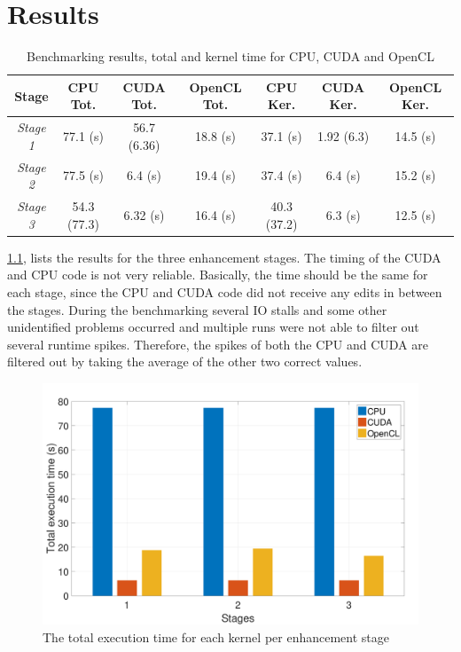 \documentclass[final]{report}
\begin{document}
\chapter{Results}

\begin{table}[H]
	\centering
	\caption{Benchmarking results, total and kernel time for CPU, CUDA and OpenCL}
	\label{tab:results}
	\begin{tabular}{ccccccc}
		\toprule
			\textbf{Stage}		& \textbf{CPU Tot.}	& \textbf{CUDA Tot.}	& \textbf{OpenCL Tot.}	& \textbf{CPU Ker.}	& \textbf{CUDA Ker.}	& \textbf{OpenCL Ker.}\\
		\midrule
			\textit{Stage 1}	& 77.1 (s)			& 56.7 (6.36)			& 18.8 (s) 				& 37.1 (s) 			& 1.92 (6.3)			& 14.5 (s)	\\
			\textit{Stage 2}	& 77.5 (s)			& 6.4 (s) 				& 19.4 (s) 				& 37.4 (s) 			& 6.4 (s) 				& 15.2 (s)	\\
			\textit{Stage 3}	& 54.3 (77.3)		& 6.32 (s) 				& 16.4 (s) 				& 40.3 (37.2) 		& 6.3 (s) 				& 12.5 (s)	\\
		\bottomrule
	\end{tabular}
\end{table}

\cref{tab:results}, lists the results for the three enhancement stages.
The timing of the CUDA and CPU code is not very reliable.
Basically, the time should be the same for each stage, since the CPU and CUDA code did not receive any edits in between the stages.
During the benchmarking several IO stalls and some other unidentified problems occurred and multiple runs were not able to filter out several runtime spikes.
Therefore, the spikes of both the CPU and CUDA are filtered out by taking the average of the other two correct values.

\begin{figure}[H]
\centering
    \includegraphics[width=\textwidth]{resources/total-time-graph.pdf}
    \caption{The total execution time for each kernel per enhancement stage}
    \label{fig:total-time-graph}
\end{figure}
\end{document}
